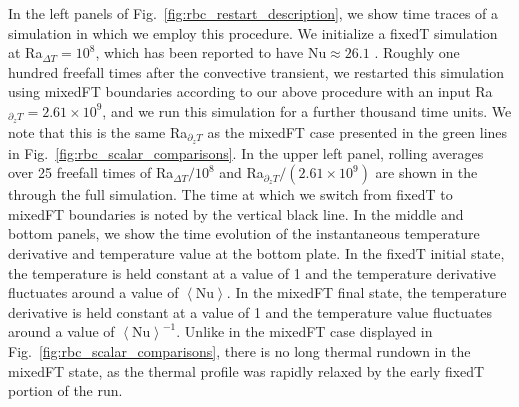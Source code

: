 \documentclass[aps, pre, onecolumn, nofootinbib, notitlepage, groupedaddress, amsfonts, amssymb, amsmath, longbibliography]{revtex4-1}
\newcommand{\angles}[1]{\ensuremath{\left\langle #1 \right\rangle}}
\begin{document}
In the left panels of Fig.~\ref{fig:rbc_restart_description}, we show time traces of a simulation in which we employ this procedure.
We initialize a fixedT simulation at Ra$_{\Delta T} = 10^8$, which has been reported to have $\text{Nu} \approx 26.1$ \cite{zhu&all2018}.
Roughly one hundred freefall times after the convective transient, we restarted this simulation using mixedFT boundaries according to our above procedure with an input Ra$_{\partial_z T} = 2.61 \times 10^9$, and we run this simulation for a further thousand time units.
We note that this is the same Ra$_{\partial_z T}$ as the mixedFT case presented in the green lines in Fig.~\ref{fig:rbc_scalar_comparisons}.
In the upper left panel, rolling averages over 25 freefall times of Ra$_{\Delta T} / 10^8$ and Ra$_{\partial_z T} / (2.61 \times 10^9)$ are shown in the through the full simulation.
The time at which we switch from fixedT to mixedFT boundaries is noted by the vertical black line.
In the middle and bottom panels, we show the time evolution of the instantaneous temperature derivative and temperature value at the bottom plate.
In the fixedT initial state, the temperature is held constant at a value of 1 and the temperature derivative fluctuates around a value of $\angles{\text{Nu}}$.
In the mixedFT final state, the temperature derivative is held constant at a value of 1 and the temperature value fluctuates around a value of $\angles{\text{Nu}}^{-1}$.
Unlike in the mixedFT case displayed in Fig.~\ref{fig:rbc_scalar_comparisons}, there is no long thermal rundown in the mixedFT state, as the thermal profile was rapidly relaxed by the early fixedT portion of the run.
\end{document}
